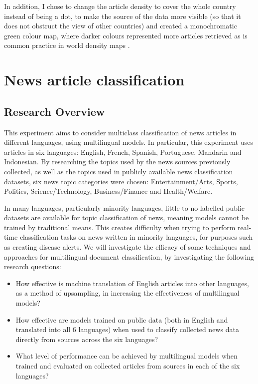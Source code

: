 \documentclass{l4proj}
\begin{document}
In addition, I chose to change the article density to cover the whole country instead of being a dot, to make the source of the data more visible (so that it does not obstruct the view of other countries) and created a monochromatic green colour map, where darker colours represented more articles retrieved as is common practice in world density maps \citep{ourworldindata_density, ons_density}.

\section{News article classification}

\subsection{Research Overview}
This experiment aims to consider multiclass classification of news articles in different languages, using multilingual models. In particular, this experiment uses articles in six languages: English, French, Spanish, Portuguese, Mandarin and Indonesian. By researching the topics used by the news sources previously collected, as well as the topics used in publicly available news classification datasets, six news topic categories were chosen: Entertainment/Arts, Sports, Politics, Science/Technology, Business/Finance and Health/Welfare. 

In many languages, particularly minority languages, little to no labelled public datasets are available for topic classification of news, meaning models cannot be trained by traditional means. This creates difficulty when trying to perform real-time classification tasks on news written in minority languages, for purposes such as creating disease alerts. We will investigate the efficacy of some techniques and approaches for multilingual document classification, by investigating the following research questions: 
\begin{itemize}
\item How effective is machine translation of English articles into other languages, as a method of upsampling, in increasing the effectiveness of multilingual models? 
\item How effective are models trained on public data (both in English and translated into all 6 languages) when used to classify collected news data directly from sources across the six languages? 
\item What level of performance can be achieved by multilingual models when trained and evaluated on collected articles from sources in each of the six languages?
\end{itemize}
\end{document}
